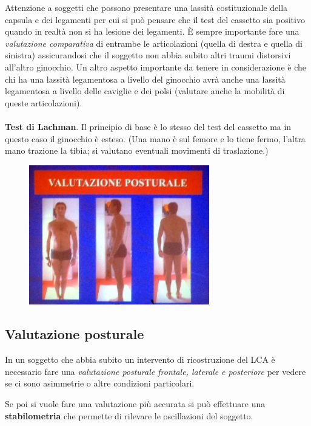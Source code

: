 Attenzione a soggetti che possono presentare una lassità costituzionale
della capsula e dei legamenti per cui si può pensare che il test del
cassetto sia positivo quando in realtà non si ha lesione dei legamenti.
È sempre importante fare una \emph{valutazione comparativa} di entrambe
le articolazioni (quella di destra e quella di sinistra) assicurandosi
che il soggetto non abbia subito altri traumi distorsivi all'altro
ginocchio. Un altro aspetto importante da tenere in considerazione è che
chi ha una lassità legamentosa a livello del ginocchio avrà anche una
lassità legamentosa a livello delle caviglie e dei polsi (valutare anche
la mobilità di queste articolazioni).
\\\\
\textbf{Test di Lachman}. Il principio di base è lo stesso del test del
cassetto ma in questo caso il ginocchio è esteso. (Una mano è sul femore
e lo tiene fermo, l'altra mano trazione la tibia; si valutano eventuali
movimenti di traslazione.)

\begin{figure}[!ht]
\centering
	\includegraphics[width=0.7\textwidth]{030/image5.jpeg}
\end{figure}

\subsection{Valutazione posturale}


In un soggetto che abbia subito un intervento di ricostruzione del LCA è
necessario fare una \emph{valutazione posturale frontale, laterale e
posteriore} per vedere se ci sono asimmetrie o altre condizioni
particolari.

Se poi si vuole fare una valutazione più accurata si può effettuare una
\textbf{stabilometria} che permette di rilevare le oscillazioni del
soggetto.

